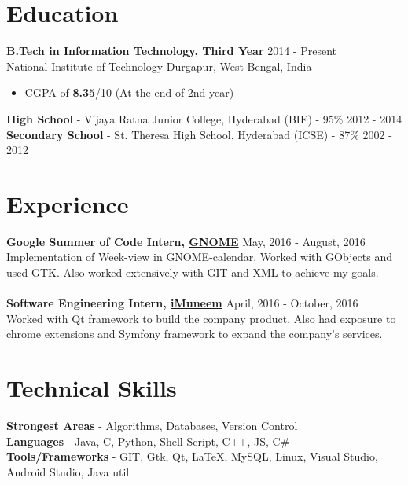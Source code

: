 \documentclass[margin, centered]{res}
\begin{document}
\begin{resume}

\section{Education}
\textbf{B.Tech in Information Technology, Third Year} \hfill 2014 - Present \\
\href{http://nitdgp.ac.in/}{National Institute of Technology Durgapur, West Bengal, India}
\begin{itemize}
 \item CGPA of \textbf{8.35}/10 (At the end of 2nd year)
\end{itemize}
\textbf{High School} - Vijaya Ratna Junior College, Hyderabad (BIE) - 95\% \hfill 2012 - 2014 \\
\textbf{Secondary School} - St. Theresa High School, Hyderabad (ICSE) - 87\% \hfill 2002 - 2012

\section{Experience}
\textbf{Google Summer of Code Intern, \href{https://summerofcode.withgoogle.com/archive/2016/projects/5194537727164416/}{GNOME}} \hfill May, 2016 - August, 2016\\
Implementation of Week-view in GNOME-calendar. Worked with GObjects and used GTK. Also worked extensively with GIT and XML to achieve my goals.   \\
\\
\textbf{Software Engineering Intern, \href{http://www.imuneem.com/}{iMuneem}} \hfill April, 2016 - October, 2016\\
Worked with Qt framework to build the company product. Also had exposure to chrome extensions and Symfony framework to expand the company's services.

\section{Technical \hspace{2mm} Skills}
\textbf{Strongest Areas} - Algorithms, Databases, Version Control\\
\textbf{Languages} - Java, C, Python, Shell Script, C++, JS, C\#\\
\textbf{Tools/Frameworks} - GIT, Gtk, Qt, \LaTeX, MySQL, Linux, Visual Studio, Android Studio, Java util


\end{resume}
\end{document}
